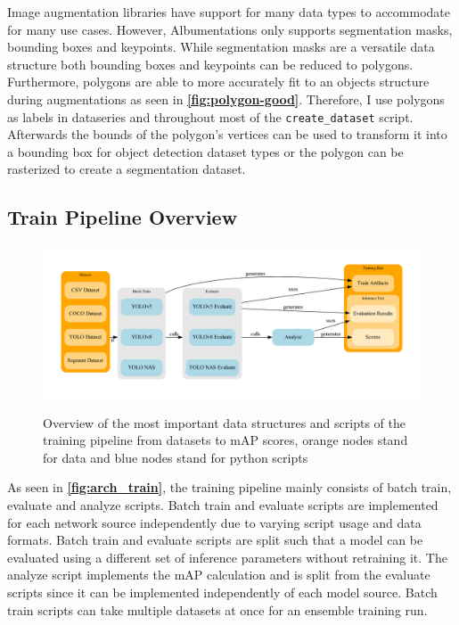 \documentclass[10pt]{book}
\newcommand{\figureref}[1]{\textbf{\autoref{#1}}}
\begin{document}
Image augmentation libraries have support for many data types to accommodate for many use cases. However, Albumentations only supports segmentation masks, bounding boxes and keypoints. While segmentation masks are a versatile data structure both bounding boxes and keypoints can be reduced to polygons. Furthermore, polygons are able to more accurately fit to an objects structure during augmentations as seen in \figureref{fig:polygon-good}. Therefore, I use polygons as labels in dataseries and throughout most of the \texttt{create\_dataset} script. Afterwards the bounds of the polygon's vertices can be used to transform it into a bounding box for object detection dataset types or the polygon can be rasterized to create a segmentation dataset.

\subsection{Train Pipeline Overview}

\begin{figure}
  \caption{Overview of the most important data structures and scripts of the training pipeline from datasets to \ac{mAP} scores, orange nodes stand for data and blue nodes stand for python scripts}
  \includegraphics[width=\textwidth]{graph/arch_train}
  \label{fig:arch_train}
\end{figure}

As seen in \figureref{fig:arch_train}, the training pipeline mainly consists of batch train, evaluate and analyze scripts. Batch train and evaluate scripts are implemented for each network source independently due to varying script usage and data formats. Batch train and evaluate scripts are split such that a model can be evaluated using a different set of inference parameters without retraining it. The analyze script implements the \ac{mAP} calculation and is split from the evaluate scripts since it can be implemented independently of each model source. Batch train scripts can take multiple datasets at once for an ensemble training run.
\end{document}
